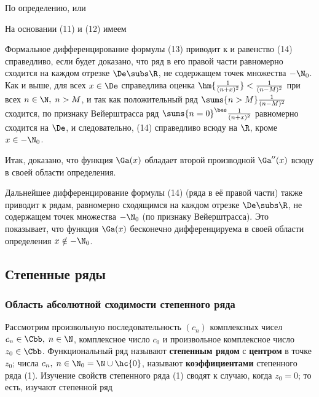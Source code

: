 \documentclass[a4paper]{article}
\begin{document}
По определению,  или 

На основании (11) и (12) имеем 

Формальное дифференцирование формулы (13) приводит к
 и равенство (14) справедливо, если
будет доказано, что ряд в его правой части равномерно сходится на
каждом отрезке $\De\subs\R$, не содержащем точек множества $-\N_0$.
Как и выше, для всех $x\in\De$ справедлива оценка
$\hm{\frac1{(n+x)^2}} < \frac1{(n-M)^2}$ при всех $n\in\N, \; n>M$,
и так как положительный ряд $\sums{n>M} \frac1{(n-M)^2}$ сходится,
по признаку Вейерштрасса ряд $\sums{n=0}^{\bes} \frac1{(n+x)^2}$
равномерно сходится на $\De$, и следовательно, (14) справедливо
всюду на $\R$, кроме $x\in -\N_0$.

Итак, доказано, что функция $\Ga(x)$ обладает второй производной
$\Ga''(x)$ всюду в своей области определения.

Дальнейшее дифференцирование формулы (14) (ряда в её правой части)
также приводит к рядам, равномерно сходящимся на каждом отрезке
$\De\subs\R$, не содержащем точек множества $-\N_0$ (по признаку
Вейерштрасса). Это показывает, что функция $\Ga(x)$ бесконечно
дифференцируема в своей области определения $x\notin-\N_0$.

\subsection{Степенные ряды}

\subsubsection{Область абсолютной сходимости степенного ряда}

Рассмотрим произвольную последовательность $(c_n)$ комплексных чисел
$c_n\in\Cbb, \; n\in\N$, комплексное число $c_0$ и произвольное
комплексное число $z_0\in\Cbb$. Функциональный ряд  называют \textbf{степенным рядом} с
\textbf{центром} в точке $z_0$; числа $c_n, \; n\in\N_0 =
\N\cup\hc{0}$, называют \textbf{коэффициентами} степенного ряда (1).
Изучение свойств степенного ряда (1) сводят к случаю, когда $z_0=0$;
то есть, изучают степенной ряд 
\end{document}
